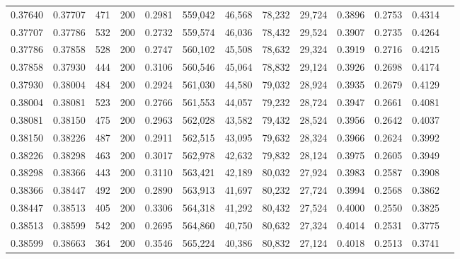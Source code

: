 \begin{tabular}{rrrrrrrrrrrrr}
0.37640 & 0.37707 &   471 & 200 &                                     0.2981 & 559,042 &  46,568 &  78,232 &  29,724 & 0.3896 & 0.2753 & 0.4314 \\
0.37707 & 0.37786 &   532 & 200 &                                     0.2732 & 559,574 &  46,036 &  78,432 &  29,524 & 0.3907 & 0.2735 & 0.4264 \\
0.37786 & 0.37858 &   528 & 200 &                                     0.2747 & 560,102 &  45,508 &  78,632 &  29,324 & 0.3919 & 0.2716 & 0.4215 \\
0.37858 & 0.37930 &   444 & 200 &                                     0.3106 & 560,546 &  45,064 &  78,832 &  29,124 & 0.3926 & 0.2698 & 0.4174 \\
0.37930 & 0.38004 &   484 & 200 &                                     0.2924 & 561,030 &  44,580 &  79,032 &  28,924 & 0.3935 & 0.2679 & 0.4129 \\
0.38004 & 0.38081 &   523 & 200 &                                     0.2766 & 561,553 &  44,057 &  79,232 &  28,724 & 0.3947 & 0.2661 & 0.4081 \\
0.38081 & 0.38150 &   475 & 200 &                                     0.2963 & 562,028 &  43,582 &  79,432 &  28,524 & 0.3956 & 0.2642 & 0.4037 \\
0.38150 & 0.38226 &   487 & 200 &                                     0.2911 & 562,515 &  43,095 &  79,632 &  28,324 & 0.3966 & 0.2624 & 0.3992 \\
0.38226 & 0.38298 &   463 & 200 &                                     0.3017 & 562,978 &  42,632 &  79,832 &  28,124 & 0.3975 & 0.2605 & 0.3949 \\
0.38298 & 0.38366 &   443 & 200 &                                     0.3110 & 563,421 &  42,189 &  80,032 &  27,924 & 0.3983 & 0.2587 & 0.3908 \\
0.38366 & 0.38447 &   492 & 200 &                                     0.2890 & 563,913 &  41,697 &  80,232 &  27,724 & 0.3994 & 0.2568 & 0.3862 \\
0.38447 & 0.38513 &   405 & 200 &                                     0.3306 & 564,318 &  41,292 &  80,432 &  27,524 & 0.4000 & 0.2550 & 0.3825 \\
0.38513 & 0.38599 &   542 & 200 &                                     0.2695 & 564,860 &  40,750 &  80,632 &  27,324 & 0.4014 & 0.2531 & 0.3775 \\
0.38599 & 0.38663 &   364 & 200 &                                     0.3546 & 565,224 &  40,386 &  80,832 &  27,124 & 0.4018 & 0.2513 & 0.3741 \\

\end{tabular}

